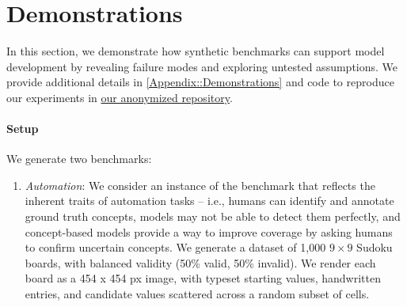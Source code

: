\documentclass[11pt]{article}
\newcommand{\repourl}[0]{\href{https://anonymous.4open.science/r/concept-benchmark-84D2}{our anonymized repository}}
\newcommand{\repourl}[0]{\href{https://github.com/ustunb/concept-benchmark}{on GitHub}}
\newcommand{\newsection}[1]{\clearpage\section{#1}}
\newcommand{\newsection}[1]{\section{#1}}
\begin{document}
\newsection{Demonstrations}
\label{Sec::Experiments}

In this section, we demonstrate how synthetic benchmarks can support model development by revealing failure modes and exploring untested assumptions. We provide additional details in \cref{Appendix::Demonstrations} and code to reproduce our experiments in \repourl{}.


\paragraph{Setup}
\label{subsec::setup}

We generate two benchmarks:
\begin{enumerate}
    
    \item \emph{Automation}: We consider an instance of the  benchmark that reflects the inherent traits of automation tasks -- i.e., humans can identify and annotate ground truth concepts, models may not be able to detect them perfectly, and concept-based models provide a way to improve coverage by asking humans to confirm uncertain concepts. We generate a dataset of 1,000 $9\times 9$ Sudoku boards, with balanced validity (50\% valid, 50\% invalid). We render each board as a 454 x 454 px image, with typeset starting values, handwritten entries, and candidate values scattered across a random subset of cells. %


\end{enumerate}
\end{document}
